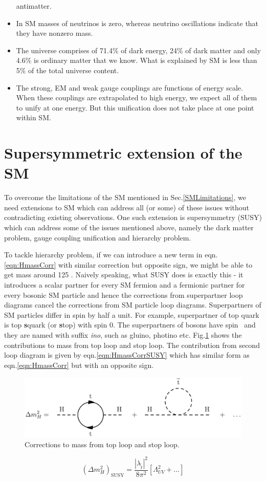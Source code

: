 \begin{itemize}
antimatter.
\item In SM masses of neutrinos is zero, whereas neutrino oscillations \cite{Fukuda:1998mi} indicate that they have nonzero mass.
\item The universe comprises of 71.4\% of dark energy, 24\% of dark matter and only 4.6\% is ordinary matter that we know. What is 
explained by SM is less than 5\% of the total universe content.
\item The strong, EM and weak gauge couplings are functions of energy scale. When these couplings are extrapolated to high energy, we 
expect all of them to unify at one energy. But this unification does not take place at one point within SM.
\end{itemize}

\section{Supersymmetric extension of the SM}
To overcome the limitations of the SM mentioned in Sec.\ref{SMLimitations}, we need extensions to SM which can address all (or some) of these 
issues without contradicting existing observations. One such extension is supersymmetry (SUSY) which can address some of the issues 
mentioned above, namely the dark matter problem, gauge coupling unification and hierarchy problem.

To tackle hierarchy problem, if we can introduce a new term in eqn.\ref{eqn:HmassCorr} with similar correction but opposite sign, we might 
be able to get \higgs mass around 125 \gev. Naively speaking, what SUSY does is exactly this - it introduces a scalar partner for every SM 
fermion and a fermionic partner for every bosonic SM particle and hence the corrections from superpartner loop diagrams cancel the 
corrections from SM particle loop diagrams. 
Superpartners of SM particles differ in spin by half a unit. For example, superpartner of top quark is top 
\textbf{s}quark (or \textbf{s}top) with spin 0. The superpartners of bosons have spin \textonehalf\ and they are named with suffix 
\textit{ino}, such as gluino, photino etc. Fig.\ref{fig:hierarchy_problem_higgs_mass_stop} shows the contributions to \higgs mass from top 
loop and stop loop. The contribution from second loop diagram is given by eqn.\ref{eqn:HmassCorrSUSY} which has similar form as 
eqn.\ref{eqn:HmassCorr} but with an opposite sign.
\begin{figure}[h!]
\centering
\includegraphics[width=0.8\linewidth]{../Figures/Chap1/hierarchy_problem_higgs_mass_stop}
\caption{Corrections to \higgs mass from top loop and stop loop.}
\label{fig:hierarchy_problem_higgs_mass_stop}
\end{figure}
\begin{equation}
(\Delta m_{H}^2)_{\text{SUSY}} = \frac{|\lambda_{\tilde{t}}|^2}{8\pi^2}[\Lambda_{UV}^2 + \dots]
\label{eqn:HmassCorrSUSY}
\end{equation}

